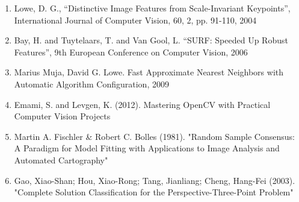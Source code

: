 \documentclass{article}
\begin{document}
\begin{enumerate}
\item Lowe, D. G., “Distinctive Image Features from Scale-Invariant Keypoints”, International Journal of Computer Vision, 60, 2, pp. 91-110, 2004

\item Bay, H. and Tuytelaars, T. and Van Gool, L. “SURF: Speeded Up Robust Features”, 9th European Conference on Computer Vision, 2006

\item Marius Muja, David G. Lowe. Fast Approximate Nearest Neighbors with Automatic Algorithm Configuration, 2009

\item Emami, S. and Levgen, K. (2012). Mastering OpenCV with Practical Computer Vision Projects

\item Martin A. Fischler \& Robert C. Bolles (1981). "Random Sample Consensus: A Paradigm for Model Fitting with Applications to Image Analysis and Automated Cartography"

\item Gao, Xiao-Shan; Hou, Xiao-Rong; Tang, Jianliang; Cheng, Hang-Fei (2003). "Complete Solution Classification for the Perspective-Three-Point Problem"
\end{enumerate}
\end{document}
